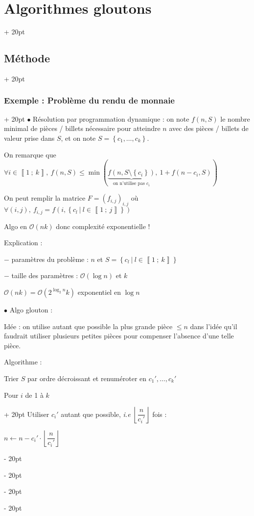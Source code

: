 \documentclass[a4paper, 12pt, twoside]{article}
\newcommand{\nset}[2]{\left\llbracket #1\ ;\ #2 \right\rrbracket}
\newcommand{\set}[1]{\left\{ #1 \right\}}
\newcommand{\floor}[1]{\left\lfloor #1 \right\rfloor}
\renewcommand{\le}{\leqslant}
\newcommand{\ind}[1][20pt]{\advance\leftskip + #1}
\newcommand{\deind}[1][20pt]{\advance\leftskip - #1}
\newenvironment{indt}[2][20pt]{#2 \par \ind[#1]}{\par \deind} %
\begin{document}
\begin{indt}{\section{Algorithmes gloutons}}
\begin{indt}{\subsection{Méthode}}
\begin{indt}{\subsubsection{Exemple : Problème du rendu de monnaie}}
                $\bullet$ Résolution par programmation dynamique : on note $f(n, S)$ le nombre minimal de pièces / billets nécessaire pour atteindre $n$ avec des pièces / billets de valeur prise dans $S$, et on note $S = \set{c_1, \ldots, c_k}$.
                
                On remarque que $\forall i \in \nset 1 k,\ f(n, S) \le \min( \underbrace{f(n, S \setminus \set{c_i})}_{\text{on n'utilise pas $c_i$}},\ 1 + f(n - c_i, S) )$
                
                On peut remplir la matrice $F = (f_{i, j})_{i, j}$ où $\forall (i, j),\ f_{i, j} = f(i, \set{c_l\ |\ l \in \nset 1 j})$
                
                Algo en $\mathcal O(nk)$ donc complexité exponentielle !
                
                Explication :
                
                $-$ paramètres du problème : $n$ et $S = \set{c_l\ |\ l \in \nset 1 k}$
                
                $-$ taille des paramètres : $\mathcal O(\log n)$ et $k$
                
                $\mathcal O(nk) = \mathcal O(2^{\log_2 n} k)$ exponentiel en $\log n$
                
                \vspace{12pt}
                
                $\bullet$ Algo glouton :
                
                Idée : on utilise autant que possible la plus grande pièce $\le n$ dans l'idée qu'il faudrait utiliser plusieurs petites pièces pour compenser l'absence d'une telle pièce.
                
                \vspace{6pt}
                
                Algorithme :
                \begin{pseudocode}
                    Trier $S$ par ordre décroissant et renuméroter en $c_1', \ldots, c_k'$
                    
                    \begin{indt}{Pour $i$ de 1 à $k$}
                        Utiliser $c_i'$ autant que possible, \textit{i.e} $\floor{\dfrac{n}{c_i'}}$ fois :
                        
                        $n \leftarrow n - c_i' \cdot \floor{\dfrac n {c_i'}}$
                    \end{indt}
                    

\end{pseudocode}
\end{indt}
\end{indt}
\end{indt}
\end{document}
